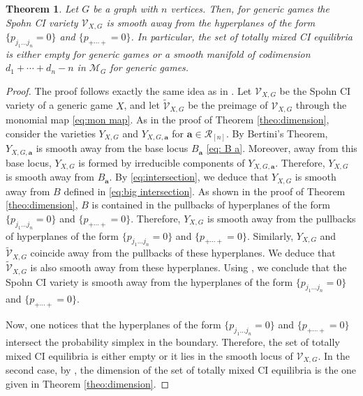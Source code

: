 \documentclass[11pt]{amsart}
\numberwithin{equation}{section}
\theoremstyle{plain}
\newtheorem{theorem}{Theorem}
\numberwithin{theorem}{section}
\theoremstyle{definition}
\begin{document}
\begin{theorem}\label{theo:smooth}
    Let $G$ be a graph with $n$ vertices. Then, for generic games the Spohn CI variety $\mathcal{V}_{X,G}$ is smooth away from the hyperplanes of the form $\{p_{j_1\ldots j_n}=0\} $ and $\{p_{+\cdots+}=0\}$. In particular, the set of totally mixed CI equilibria is either empty for generic games or a smooth manifold of codimension $d_1+\cdots +d_n-n$ in $\mathcal{M}_G$ for generic games.
\end{theorem}
\begin{proof}
    The proof follows exactly the same idea as in \cite[Theorem 12]{portakal2024game}. Let $\mathcal{V}_{X,G}$ be the Spohn CI variety of a generic game $X$, and let $\widetilde{\mathcal{V}}_{X,G}$ be the preimage of $\mathcal{V}_{X,G}$ through the monomial map \eqref{eq:mon map}. As in the proof of Theorem \ref{theo:dimension}, consider the varieties $Y_{X,G}$ and $Y_{X,G,\mathbf{a}}$ for $\mathbf{a}\in\mathcal{R}_{[n]}$. By Bertini's Theorem,  $Y_{X,G,\mathbf{a}}$ is smooth away from the base locus $B_{\mathbf{a}}$ \eqref{eq: B a}. Moreover, away from this base locus, $Y_{X,G}$ is formed by irreducible components of $Y_{X,G,\mathbf{a}}$. Therefore, $Y_{X,G}$ is smooth away from $B_{\mathbf{a}}$. By \eqref{eq:intersection}, we deduce that   $Y_{X,G}$ is smooth away from $B$ defined in \eqref{eq:big intersection}.
     As shown in the proof of Theorem \ref{theo:dimension}, $B$ is contained in the pullbacks of hyperplanes of the form $\{p_{j_1\ldots j_n}=0\} $ and $\{p_{+\cdots+}=0\}$. Therefore, $Y_{X,G}$ is smooth away from the pullbacks of hyperplanes of the form $\{p_{j_1\ldots j_n}=0\} $ and $\{p_{+\cdots+}=0\}$. Similarly, $Y_{X,G}$ and $\widetilde{\mathcal{V}}_{X,G}$ coincide away from the pullbacks of these hyperplanes. We deduce that 
    $\widetilde{\mathcal{V}}_{X,G}$  is also smooth away from these hyperplanes. Using \cite[Tag 02KM]{stacks-project}, we conclude that the Spohn CI variety is smooth away from the hyperplanes of the form $\{p_{j_1\ldots j_n}=0\} $ and $\{p_{+\cdots+}=0\}$.

    Now, one notices that the hyperplanes of the form $\{p_{j_1\ldots j_n}=0\} $ and $\{p_{+\cdots+}=0\}$ intersect the probability simplex in the boundary. Therefore, the set of totally mixed CI equilibria is either empty or it lies in the smooth locus of $\mathcal{V}_{X,G}$. In the second case, by \cite[Theorem 2.2.9]{mangolte2020real}, the dimension of the set of totally mixed CI equilibria  is the one given in Theorem \ref{theo:dimension}.
\end{proof}
\end{document}
